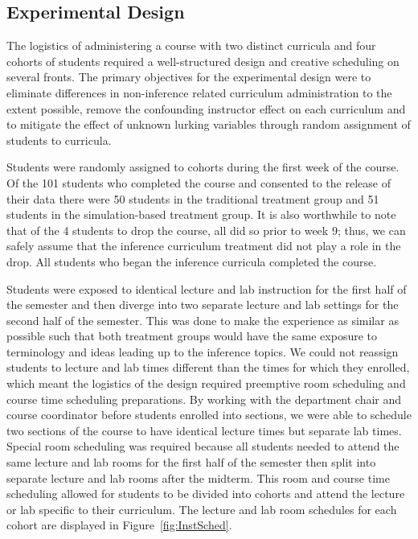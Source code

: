\subsection{Experimental Design}
\label{design}

The logistics of administering a course with two distinct curricula and four cohorts of students required a well-structured design and creative scheduling on several fronts.  The primary objectives for the experimental design were to eliminate differences in non-inference related curriculum administration to the extent possible, remove the confounding instructor effect on each curriculum and to mitigate the effect of unknown lurking variables through random assignment of students to curricula.  

Students were randomly assigned to cohorts during the first week of the course.  Of the 101 students who completed the course and consented to the release of their data there were 50 students in the traditional treatment group and 51 students in the simulation-based treatment group. It is also worthwhile to note that of the 4 students to drop the course, all did so prior to week 9; thus, we can safely assume that the inference curriculum treatment did not play a role in the drop. All students who began the inference curricula completed the course.

Students were exposed to identical lecture and lab instruction for the first half of the semester and then diverge into two separate lecture and lab settings for the second half of the semester. This was done to make the experience as similar as possible such that both treatment groups would have the same exposure to terminology and ideas leading up to the inference topics. We could not reassign students to lecture and lab times different than the times for which they enrolled, which meant the logistics of the design required preemptive room scheduling and course time scheduling preparations.  By working with the department chair and course coordinator before students enrolled into sections, we were able to schedule two sections of the course to have identical lecture times but separate lab times. Special room scheduling was required because all students needed to attend the same lecture and lab rooms for the first half of the semester then split into separate lecture and lab rooms after the midterm.  This room and course time scheduling allowed for students to be divided into cohorts and attend the lecture or lab specific to their curriculum.  The lecture and lab room schedules for each cohort are displayed in Figure~\ref{fig:InstSched}.

